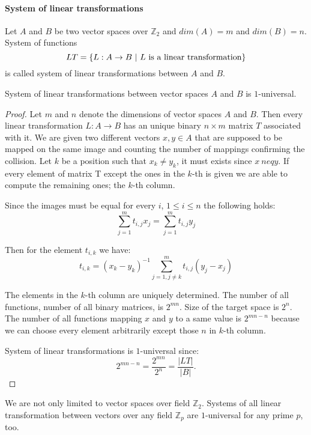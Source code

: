 \paragraph{System of linear transformations}
\begin{definition}
\label{definition-system-of-linear-transformations}
Let $A$ and $B$ be two vector spaces over $\mathbb{Z}_2$ and $dim(A) = m$ and $dim(B) = n$. System of functions \[ LT = \{L : A \rightarrow B \ | \  L \text{ is a linear transformation}\} \] is called system of linear transformations between $A$ and $B$.
\end{definition}
\begin{remark}
System of linear transformations between vector spaces $A$ and $B$ is $1$-universal.
\end{remark}
\begin{proof}
Let $m$ and $n$ denote the dimensions of vector spaces $A$ and $B$. Then every linear transformation $L: A \rightarrow B$ has an unique binary $n \times m$ matrix $T$ associated with it. We are given two different vectors $x, y \in A$ that are supposed to be mapped on the same image and counting the number of mappings confirming the collision. Let $k$ be a position such that $x_k \neq y_k$, it must exists since $x\ neq y$. If every element of matrix T except the ones in the $k$-th is given we are able to compute the remaining ones; the $k$-th column. 

Since the images must be equal for every $i$, $1 \leq i \leq n$ the following holds:
\[
\displaystyle\sum_{j = 1}^{m}t_{i, j}x_j = \displaystyle\sum_{j = 1}^{m}t_{i, j}y_j
\]

Then for the element $t_{i, k}$ we have:
\[
t_{i, k} = (x_k - y_k)^{-1}\displaystyle\sum_{j = 1, j \neq k}^{m}t_{i, j}(y_j - x_j)
\]

The elements in the $k$-th column are uniquely determined. The number of all functions, number of all binary matrices, is $2^{mn}$. Size of the target space is $2^n$. The number of all functions mapping $x$ and $y$ to a same value is $2^{mn - n}$ because we can choose every element arbitrarily except those $n$ in $k$-th column. 

System of linear transformations is $1$-universal since:
\[
2^{mn - n} = \frac{2^{mn}}{2^n} = \frac{|LT|}{|B|} \textit{.}
\]
\end{proof}

We are not only limited to vector spaces over field $\mathbb{Z}_2$. Systems of all linear transformation between vectors over any field $\mathbb{Z}_p$ are $1$-universal for any prime $p$, too.


